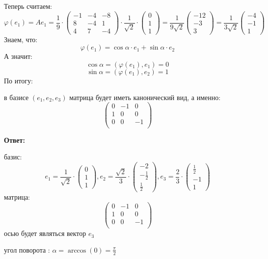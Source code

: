 \documentclass[a4paper,12pt]{article}
\begin{document}
Теперь считаем:
\[
\varphi(e_1) = A e_1 = \frac{1}{9} \cdot \begin{pmatrix}
-1 & -4 & -8 \\ 8 & -4 & 1 \\ 4 & 7 & -4 
\end{pmatrix} \cdot \frac{1}{\sqrt{2}} \cdot \begin{pmatrix}
0 \\ 1 \\ 1
\end{pmatrix} = \frac{1}{9 \sqrt{2}}\left(\begin{matrix}
-12 \\
-3 \\
3
\end{matrix}\right) = \frac{1}{3 \sqrt{2}} \begin{pmatrix}
-4 \\ -1 \\1 
\end{pmatrix}
\]
Знаем, что: 
\[
\varphi(e_1) = \cos \alpha \cdot e_1 + \sin \alpha \cdot e_2
\]
А значит:
\[
\cos \alpha = (\varphi(e_1), e_1) = 0
\]
\[
\sin \alpha = (\varphi(e_1), e_2) = 1
\] 
По итогу:

в базисе $(e_1, e_2, e_3)$ матрица будет иметь канонический вид, а именно:
\[
\begin{pmatrix}
0 & -1 & 0 \\
1 & 0 & 0 \\
0 & 0 & -1 \\
\end{pmatrix}
\]
\clearpage
\begin{center}
\textbf{Ответ: } 

базис:
\[
e_1 = \frac{1}{\sqrt{2}} \cdot \begin{pmatrix}
0 \\ 1 \\ 1
\end{pmatrix}, 
e_2 = \frac{\sqrt{2}}{3} \cdot \begin{pmatrix} -2 \\ -\frac12 \\ \frac12 \end{pmatrix},
e_3 = \frac23  \cdot \begin{pmatrix}
\frac12 \\ -1 \\ 1
\end{pmatrix}
\]
матрица:
\[
\begin{pmatrix}
0 & -1 & 0 \\
1 & 0 & 0 \\
0 & 0 & -1 \\
\end{pmatrix}
\]
осью будет являться вектор $e_3$

угол поворота : $\alpha = \arccos(0) = \frac{\pi}{2}$
\end{center}
\end{document}
